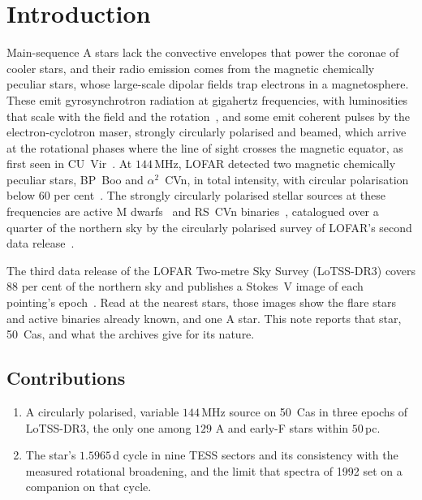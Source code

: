 \documentclass[3p,11pt]{elsarticle}
\begin{document}
\section{Introduction}\label{sec:intro}

Main-sequence A stars lack the convective envelopes that power the coronae of cooler
stars, and their radio emission comes from the magnetic chemically peculiar stars,
whose large-scale dipolar fields trap electrons in a magnetosphere. These emit
gyrosynchrotron radiation at gigahertz frequencies, with luminosities that scale with
the field and the rotation~\cite{Leto2021}, and some emit coherent pulses by the
electron-cyclotron maser, strongly circularly polarised and beamed, which arrive at the
rotational phases where the line of sight crosses the magnetic equator, as first seen in
CU~Vir~\cite{Trigilio2000}. At $144$\,MHz, LOFAR detected two magnetic chemically
peculiar stars, BP~Boo and $\alpha^2$~CVn, in total intensity, with circular
polarisation below $60$ per cent~\cite{Hajduk2022}. The strongly circularly polarised
stellar sources at these frequencies are active M dwarfs~\cite{Callingham2021} and
RS~CVn binaries~\cite{Toet2021}, catalogued over a quarter of the northern sky by the
circularly polarised survey of LOFAR's second data release~\cite{Callingham2023}.

The third data release of the LOFAR Two-metre Sky Survey (LoTSS-DR3) covers $88$ per
cent of the northern sky and publishes a Stokes~V image of each pointing's
epoch~\cite{Shimwell2026}. Read at the nearest stars, those images show the flare stars
and active binaries already known, and one A star. This note reports that star, 50~Cas,
and what the archives give for its nature.

\subsection{Contributions}
\begin{enumerate}[leftmargin=*,itemsep=1pt]
\item A circularly polarised, variable $144$\,MHz source on 50~Cas in three epochs of
LoTSS-DR3, the only one among $129$ A and early-F stars within $50$\,pc.
\item The star's $1.5965$\,d cycle in nine TESS sectors and its consistency with the
measured rotational broadening, and the limit that spectra of 1992 set on a companion
on that cycle.
\end{enumerate}
\end{document}

